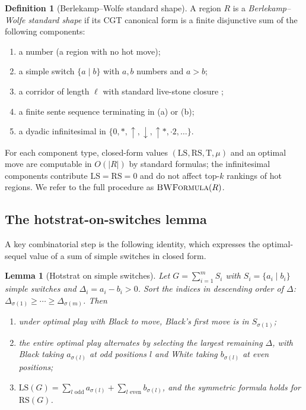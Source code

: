 \documentclass[11pt,a4paper]{amsart}
\newtheorem{lemma}[theorem]{Lemma}
\theoremstyle{definition}
\newtheorem{definition}[theorem]{Definition}
\theoremstyle{remark}
\newcommand{\LS}{\mathrm{LS}}
\newcommand{\RS}{\mathrm{RS}}
\newcommand{\Tt}{\mathrm{T}}
\begin{document}
\begin{definition}[Berlekamp--Wolfe standard shape]\label{def:BWshape}
A region $R$ is a \emph{Berlekamp--Wolfe standard shape} if its CGT
canonical form is a finite disjunctive sum of the following components:
\begin{enumerate}[label=(\alph*)]
\item a number (a region with no hot move);
\item a simple switch $\{a \mid b\}$ with $a, b$ numbers and $a > b$;
\item a corridor of length $\ell$ with standard live-stone closure
  \cite[Ch.~3]{BW1994};
\item a finite sente sequence terminating in (a) or (b);
\item a dyadic infinitesimal in $\{0, *, \uparrow, \downarrow, \uparrow*,
  \cdot 2, \dots\}$.
\end{enumerate}
\end{definition}

For each component type, closed-form values $(\LS, \RS, \Tt, \mu)$ and an
optimal move are computable in $O(|R|)$ by standard formulas; the
infinitesimal components contribute $\LS = \RS = 0$ and do not affect
top-$k$ rankings of hot regions. We refer to the full procedure as
$\textsc{BWFormula}(R)$.

\subsection{The hotstrat-on-switches lemma}

A key combinatorial step is the following identity, which expresses the
optimal-sequel value of a sum of simple switches in closed form.

\begin{lemma}[Hotstrat on simple switches]\label{lem:H}
Let $G = \sum_{i=1}^m S_i$ with $S_i = \{a_i \mid b_i\}$ simple switches
and $\Delta_i = a_i - b_i > 0$. Sort the indices in descending order of
$\Delta$: $\Delta_{\sigma(1)} \geq \cdots \geq \Delta_{\sigma(m)}$. Then
\begin{enumerate}[label=(\alph*)]
\item under optimal play with Black to move, Black's first move is in
  $S_{\sigma(1)}$;
\item the entire optimal play alternates by selecting the
  largest remaining $\Delta$, with Black taking $a_{\sigma(l)}$ at odd
  positions $l$ and White taking $b_{\sigma(l)}$ at even positions;
\item $\LS(G) = \sum_{l \text{ odd}} a_{\sigma(l)} +
  \sum_{l \text{ even}} b_{\sigma(l)}$, and the symmetric formula holds
  for $\RS(G)$.
\end{enumerate}
\end{lemma}
\end{document}
